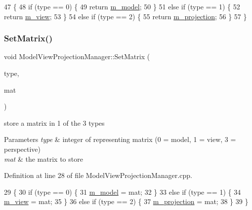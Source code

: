 \begin{DoxyCode}
47 \{
48     \textcolor{keywordflow}{if} (type == 0) \{
49         \textcolor{keywordflow}{return} \mbox{\hyperlink{class_model_view_projection_manager_af5b11770293ecea8efcddb473532270d}{m\_model}};
50     \}
51     \textcolor{keywordflow}{else} \textcolor{keywordflow}{if} (type == 1) \{
52         \textcolor{keywordflow}{return} \mbox{\hyperlink{class_model_view_projection_manager_a67704be9c327d11ef3b04b9d535ce5bf}{m\_view}};
53     \}
54     \textcolor{keywordflow}{else} \textcolor{keywordflow}{if} (type == 2) \{
55         \textcolor{keywordflow}{return} \mbox{\hyperlink{class_model_view_projection_manager_a133f02be971dd08a102883df4373b95d}{m\_projection}};
56     \}
57 \}
\end{DoxyCode}
\mbox{\label{class_model_view_projection_manager_a924c97ae5988c33bd9585d3000d811e1}} 
\subsubsection{\texorpdfstring{Set\+Matrix()}{SetMatrix()}}
{\footnotesize\ttfamily void Model\+View\+Projection\+Manager\+::\+Set\+Matrix (\begin{DoxyParamCaption}\item[{U\+I\+NT}]{type,  }\item[{X\+M\+M\+A\+T\+R\+IX}]{mat }\end{DoxyParamCaption})}



store a matrix in 1 of the 3 types 


\begin{DoxyParams}{Parameters}
{\em type} & integer of representing matrix (0 = model, 1 = view, 3 = perspective) \\
\hline
{\em mat} & the matrix to store \\
\hline
\end{DoxyParams}


Definition at line 28 of file Model\+View\+Projection\+Manager.\+cpp.


\begin{DoxyCode}
29 \{
30     \textcolor{keywordflow}{if} (type == 0) \{
31         \mbox{\hyperlink{class_model_view_projection_manager_af5b11770293ecea8efcddb473532270d}{m\_model}} = mat;
32     \}
33     \textcolor{keywordflow}{else} \textcolor{keywordflow}{if} (type == 1) \{
34         \mbox{\hyperlink{class_model_view_projection_manager_a67704be9c327d11ef3b04b9d535ce5bf}{m\_view}} = mat;
35     \}
36     \textcolor{keywordflow}{else} \textcolor{keywordflow}{if} (type == 2) \{
37         \mbox{\hyperlink{class_model_view_projection_manager_a133f02be971dd08a102883df4373b95d}{m\_projection}} = mat;
38     \}
39 \}
\end{DoxyCode}


